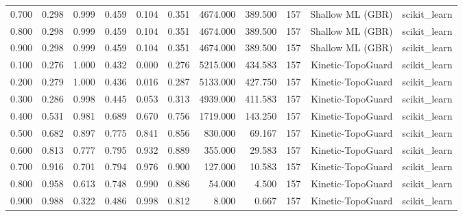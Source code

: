 \begin{tabular}{lrrrrrrrrrr}
0.700 & 0.298 & 0.999 & 0.459 & 0.104 & 0.351 & 4674.000 & 389.500 & 157 & Shallow ML (GBR) & scikit\_learn \\
0.800 & 0.298 & 0.999 & 0.459 & 0.104 & 0.351 & 4674.000 & 389.500 & 157 & Shallow ML (GBR) & scikit\_learn \\
0.900 & 0.298 & 0.999 & 0.459 & 0.104 & 0.351 & 4674.000 & 389.500 & 157 & Shallow ML (GBR) & scikit\_learn \\
0.100 & 0.276 & 1.000 & 0.432 & 0.000 & 0.276 & 5215.000 & 434.583 & 157 & Kinetic-TopoGuard & scikit\_learn \\
0.200 & 0.279 & 1.000 & 0.436 & 0.016 & 0.287 & 5133.000 & 427.750 & 157 & Kinetic-TopoGuard & scikit\_learn \\
0.300 & 0.286 & 0.998 & 0.445 & 0.053 & 0.313 & 4939.000 & 411.583 & 157 & Kinetic-TopoGuard & scikit\_learn \\
0.400 & 0.531 & 0.981 & 0.689 & 0.670 & 0.756 & 1719.000 & 143.250 & 157 & Kinetic-TopoGuard & scikit\_learn \\
0.500 & 0.682 & 0.897 & 0.775 & 0.841 & 0.856 & 830.000 & 69.167 & 157 & Kinetic-TopoGuard & scikit\_learn \\
0.600 & 0.813 & 0.777 & 0.795 & 0.932 & 0.889 & 355.000 & 29.583 & 157 & Kinetic-TopoGuard & scikit\_learn \\
0.700 & 0.916 & 0.701 & 0.794 & 0.976 & 0.900 & 127.000 & 10.583 & 157 & Kinetic-TopoGuard & scikit\_learn \\
0.800 & 0.958 & 0.613 & 0.748 & 0.990 & 0.886 & 54.000 & 4.500 & 157 & Kinetic-TopoGuard & scikit\_learn \\
0.900 & 0.988 & 0.322 & 0.486 & 0.998 & 0.812 & 8.000 & 0.667 & 157 & Kinetic-TopoGuard & scikit\_learn \\
\bottomrule
\end{tabular}